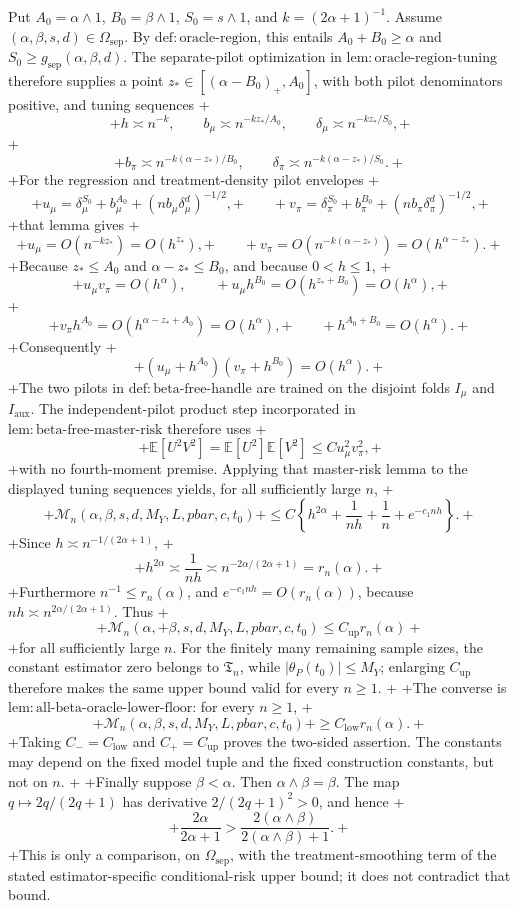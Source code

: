 Put \(A_0=\alpha\wedge1\), \(B_0=\beta\wedge1\), \(S_0=s\wedge1\), and \(k=(2\alpha+1)^{-1}\). Assume \((\alpha,\beta,s,d)\in\Omega_{\mathrm{sep}}\). By \(\mathrm{def:oracle\text{-}region}\), this entails \(A_0+B_0\ge\alpha\) and \(S_0\ge g_{\mathrm{sep}}(\alpha,\beta,d)\). The separate-pilot optimization in \(\mathrm{lem:oracle\text{-}region\text{-}tuning}\) therefore supplies a point \(z_*\in[(\alpha-B_0)_+,A_0]\), with both pilot denominators positive, and tuning sequences
+\[
+h\asymp n^{-k},\qquad b_\mu\asymp n^{-kz_*/A_0},\qquad \delta_\mu\asymp n^{-kz_*/S_0},
+\]
+\[
+b_\pi\asymp n^{-k(\alpha-z_*)/B_0},\qquad \delta_\pi\asymp n^{-k(\alpha-z_*)/S_0}.
+\]
+For the regression and treatment-density pilot envelopes
+\[
+u_\mu=\delta_\mu^{S_0}+b_\mu^{A_0}+(n b_\mu\delta_\mu^d)^{-1/2},
+\qquad
+v_\pi=\delta_\pi^{S_0}+b_\pi^{B_0}+(n b_\pi\delta_\pi^d)^{-1/2},
+\]
+that lemma gives
+\[
+u_\mu=O(n^{-kz_*})=O(h^{z_*}),
+\qquad
+v_\pi=O(n^{-k(\alpha-z_*)})=O(h^{\alpha-z_*}).
+\]
+Because \(z_*\le A_0\) and \(\alpha-z_*\le B_0\), and because \(0<h\le1\),
+\[
+u_\mu v_\pi=O(h^\alpha),\qquad
+u_\mu h^{B_0}=O(h^{z_*+B_0})=O(h^\alpha),
+\]
+\[
+v_\pi h^{A_0}=O(h^{\alpha-z_*+A_0})=O(h^\alpha),
+\qquad
+h^{A_0+B_0}=O(h^\alpha).
+\]
+Consequently
+\[
+(u_\mu+h^{A_0})(v_\pi+h^{B_0})=O(h^\alpha).
+\]
+The two pilots in \(\mathrm{def:beta\text{-}free\text{-}handle}\) are trained on the disjoint folds \(I_\mu\) and \(I_{\mathrm{aux}}\). The independent-pilot product step incorporated in \(\mathrm{lem:beta\text{-}free\text{-}master\text{-}risk}\) therefore uses
+\[
+\mathbb E[U^2V^2]=\mathbb E[U^2]\mathbb E[V^2]\le C u_\mu^2v_\pi^2,
+\]
+with no fourth-moment premise. Applying that master-risk lemma to the displayed tuning sequences yields, for all sufficiently large \(n\),
+\[
+\mathcal M_n(\alpha,\beta,s,d,M_Y,L,pbar,c,t_0)
+\le C\left\{h^{2\alpha}+\frac1{nh}+\frac1n+e^{-c_1nh}\right\}.
+\]
+Since \(h\asymp n^{-1/(2\alpha+1)}\),
+\[
+h^{2\alpha}\asymp\frac1{nh}\asymp n^{-2\alpha/(2\alpha+1)}=r_n(\alpha).
+\]
+Furthermore \(n^{-1}\le r_n(\alpha)\), and \(e^{-c_1nh}=O(r_n(\alpha))\), because \(nh\asymp n^{2\alpha/(2\alpha+1)}\). Thus
+\[
+\mathcal M_n(\alpha,
+\beta,s,d,M_Y,L,pbar,c,t_0)\le C_{\mathrm{up}}r_n(\alpha)
+\]
+for all sufficiently large \(n\). For the finitely many remaining sample sizes, the constant estimator zero belongs to \(\mathfrak T_n\), while \(\lvert\theta_P(t_0)\rvert\le M_Y\); enlarging \(C_{\mathrm{up}}\) therefore makes the same upper bound valid for every \(n\ge1\).
+
+The converse is \(\mathrm{lem:all\text{-}beta\text{-}oracle\text{-}lower\text{-}floor}\): for every \(n\ge1\),
+\[
+\mathcal M_n(\alpha,\beta,s,d,M_Y,L,pbar,c,t_0)
+\ge C_{\mathrm{low}}r_n(\alpha).
+\]
+Taking \(C_-=C_{\mathrm{low}}\) and \(C_+=C_{\mathrm{up}}\) proves the two-sided assertion. The constants may depend on the fixed model tuple and the fixed construction constants, but not on \(n\).
+
+Finally suppose \(\beta<\alpha\). Then \(\alpha\wedge\beta=\beta\). The map \(q\mapsto2q/(2q+1)\) has derivative \(2/(2q+1)^2>0\), and hence
+\[
+\frac{2\alpha}{2\alpha+1}>\frac{2(\alpha\wedge\beta)}{2(\alpha\wedge\beta)+1}.
+\]
+This is only a comparison, on \(\Omega_{\mathrm{sep}}\), with the treatment-smoothing term of the stated estimator-specific conditional-risk upper bound; it does not contradict that bound.